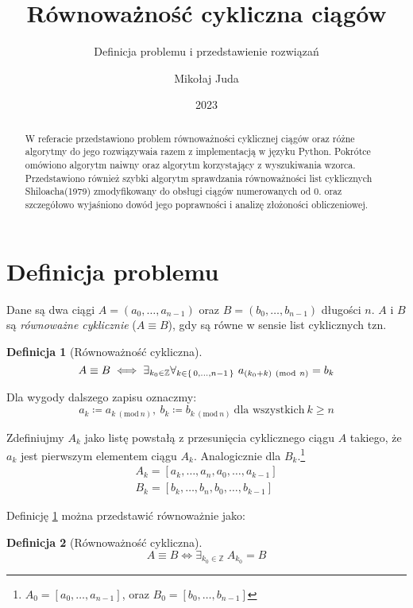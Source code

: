 \documentclass{scrartcl}
\title{Równoważność cykliczna ciągów}
\subtitle{Definicja problemu i przedstawienie rozwiązań}
\date{2023}
\author{Mikołaj Juda}
\newcommand{\Mod}[1]{\ (\mathrm{mod}\ #1)}
\theoremstyle{definition}
\newtheorem{cyclic_equivalence_1}{Definicja}[section]
\newtheorem{cyclic_equivalence_2}
[cyclic_equivalence_1]{Definicja}
\theoremstyle{plain}
\theoremstyle{remark}
\theoremstyle{plain}
\theoremstyle{definition}
\theoremstyle{plain}
\begin{document}
\maketitle
\begin{abstract}
	W referacie przedstawiono
	problem równoważności cyklicznej ciągów
	oraz różne algorytmy do jego rozwiązywaia
	razem z implementacją w języku Python.
	Pokrótce omówiono algorytm naiwny
	oraz algorytm korzystający z wyszukiwania wzorca.
	Przedstawiono również
	szybki algorytm sprawdzania równoważności
	list cyklicznych Shiloacha(1979)\cite{shiloach1979}
	zmodyfikowany do obsługi ciągów
	numerowanych od \(0\)\cite{wazniakmimuw}.
	oraz szczegółowo wyjaśniono dowód jego poprawności
	i analizę złożoności obliczeniowej.
\end{abstract}
\tableofcontents
\pagebreak
\section{Definicja problemu}
Dane są dwa ciągi
\(A=(a_0,\dots,a_{n-1})\) oraz \(B=(b_0,\dots,b_{n-1})\)
długości \(n\).\linebreak
\(A\) i \(B\) są \emph{równoważne cyklicznie}
(\(A\equiv B\)),
gdy są równe w sensie list cyklicznych tzn.
\begin{cyclic_equivalence_1}[Równoważność cykliczna]
	\label{def:cyclic_equivalence_1}
	\[A\equiv B \iff \exists_{k_0\in\mathbb{Z}}
		\forall_{k\in\set{0,\dots,n-1}}\ a_{(k_0+k)\Mod{n}}=b_k\]
\end{cyclic_equivalence_1}

Dla wygody dalszego zapisu oznaczmy:
\[a_k\coloneq a_{k\Mod{n}},\ b_k\coloneq b_{k\Mod{n}}
	\ \text{dla wszystkich}\ k\ge n\]

Zdefiniujmy \(A_k\) jako listę powstałą z przesunięcia cyklicznego
ciągu \(A\) takiego, że \(a_k\) jest
pierwszym elementem ciągu \(A_k\).
Analogicznie dla \(B_k\).\footnote{\(A_0=[a_0,\dots,a_{n-1}]\),
oraz \(B_0=[b_0,\dots,b_{n-1}]\)}
\begin{align*}
	A_k=[a_{k},\dots,a_n,a_0,\dots,a_{k-1}] \\
	B_k=[b_{k},\dots,b_n,b_0,\dots,b_{k-1}]
\end{align*}

Definicję \cref{def:cyclic_equivalence_1} można
przedstawić równoważnie jako:
\begin{cyclic_equivalence_2}[Równoważność cykliczna]
	\[A\equiv B \iff \exists_{k_0\in\mathbb{Z}}
		\ A_{k_0}=B\]
\end{cyclic_equivalence_2}
\end{document}
